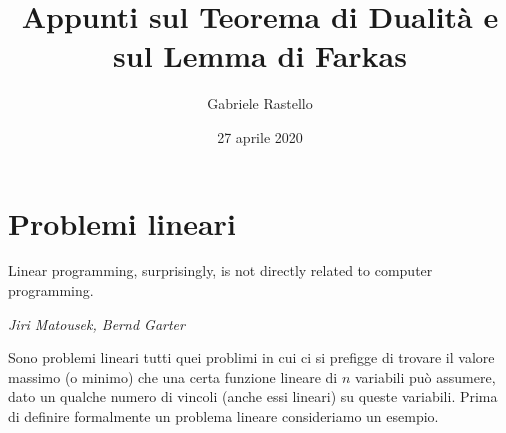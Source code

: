 \documentclass[italian, 12pt, reqno]{article}
\theoremstyle{myteo}
\numberwithin{equation}{section}
\begin{document}
\title{Appunti sul Teorema di Dualità e sul Lemma di Farkas}
\author{Gabriele Rastello}
\date{27 aprile 2020}
\maketitle
\tableofcontents

\newpage
\section{Problemi lineari}
\label{sec:problemi_lineari}
\epigraph{Linear programming, surprisingly, is not directly related to computer programming.}{\textit{Jiri Matousek, Bernd Garter}}
Sono problemi lineari tutti quei problimi in cui ci si prefigge di trovare il valore massimo (o minimo) che una certa funzione lineare di \(n\) variabili può assumere, dato un qualche numero di vincoli (anche essi lineari) su queste variabili.
Prima di definire formalmente un problema lineare consideriamo un esempio.
\end{document}
